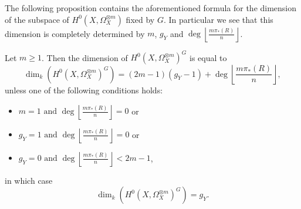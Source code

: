 The following proposition contains the aforementioned formula for the dimension of the subspace of $H^0(X,\Omega_X^{\otimes m})$ fixed by $G$.
In particular we see that this dimension is completely determined by $m$, $g_Y$ and $\deg \left\lfloor \frac{m\pi_*(R)}{n} \right\rfloor$.


    \begin{prop}\label{dim}
    Let $m\geq 1$. Then the dimension of $H^0(X,\Omega_X^{\otimes m})^G$ is equal to
        \[
        \dim_k \left( H^0(X,\Omega_X^{\otimes m})^G \right) = (2m-1)(g_Y-1) + \deg\left\lfloor\frac{m\pi_*(R)}{n} \right\rfloor,
        \]  
    unless one of the following conditions holds:
        \begin{itemize}
        \item $m=1 \mbox{ and } \deg\left\lfloor\frac{m\pi_*(R)}{n}\right\rfloor = 0$ or
        \item $g_Y=1 \mbox{ and } \deg\left\lfloor\frac{m\pi_*(R)}{n}\right\rfloor = 0$ or
        \item  $g_Y=0 \mbox{ and } \deg\left\lfloor\frac{m\pi_*(R)}{n}\right\rfloor < 2m-1$,
        \end{itemize}
    in which case 
        \[
        \dim_k \left( H^0(X,\Omega_X^{\otimes m})^G \right) = g_Y.
        \]      
    \end{prop}
